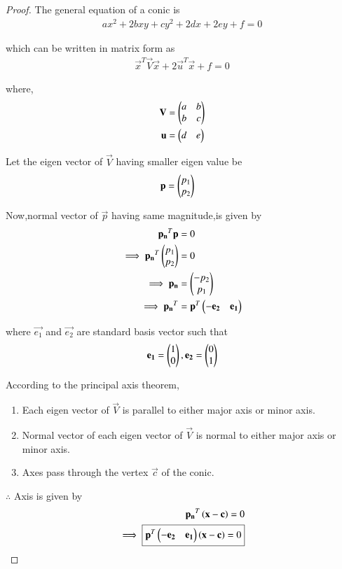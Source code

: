 \documentclass[journal,12pt,twocolumn]{IEEEtran}
\begin{document}
\begin{proof}
The general equation of a conic is
\begin{align}
  ax^2+2bxy+cy^2+2dx+2ey+f=0
\end{align}

which can be written in matrix form as
\begin{align}
    \vec{x}^T\vec{V}\vec{x} + 2\vec{u}^T\vec{x} + f =0
\end{align}

where,
\begin{align}
    \mathbf{V} &=\begin{pmatrix}a & b \\ b& c\end{pmatrix}
    \\
    \mathbf{u} &= \begin{pmatrix}d & e\end{pmatrix}
\end{align}

Let the eigen vector of $\vec{V}$ having smaller eigen value be
\begin{align}
    \mathbf{p} &= \begin{pmatrix}p_1 \\ p_2\end{pmatrix}
\end{align}

Now,normal vector of $\vec{p}$ having same magnitude,is given by
\begin{align}
    \mathbf{p_n}^T\mathbf{p} &= 0
    \\
    \implies \mathbf{p_n}^T\begin{pmatrix}p_1 \\ p_2\end{pmatrix} &= 0 \\
    \implies \mathbf{p_n} &= \begin{pmatrix}-p_2 \\ p_1\end{pmatrix} \\
    \implies \mathbf{p_n}^T &= \mathbf{p}^T\begin{pmatrix}-\mathbf{e_2} & \mathbf{e_1}\end{pmatrix}
\end{align}

where $\vec{e_1}$ and $\vec{e_2}$ are standard basis vector such that
\begin{align}
    \mathbf{e_1} = \begin{pmatrix}1 \\ 0\end{pmatrix} , \mathbf{e_2} = \begin{pmatrix}0 \\ 1\end{pmatrix}
\end{align}

According to the principal axis theorem,
\begin{enumerate}
    \item Each eigen vector of $\vec{V}$ is parallel to either major axis or minor axis.
    \item Normal vector of each eigen vector of $\vec{V}$ is normal to either major axis or minor axis.
    \item Axes pass through the vertex $\vec{c}$ of the conic.
\end{enumerate}

$\therefore$ Axis is given by
\begin{align}
    \mathbf{p_n}^T\left(\mathbf{x}-\mathbf{c}\right) = 0 \\
    \implies \boxed{\mathbf{p}^T\begin{pmatrix}-\mathbf{e_2} & \mathbf{e_1}\end{pmatrix}\left(\mathbf{x}-\mathbf{c}\right) = 0}
\end{align}

\end{proof}
\end{document}
